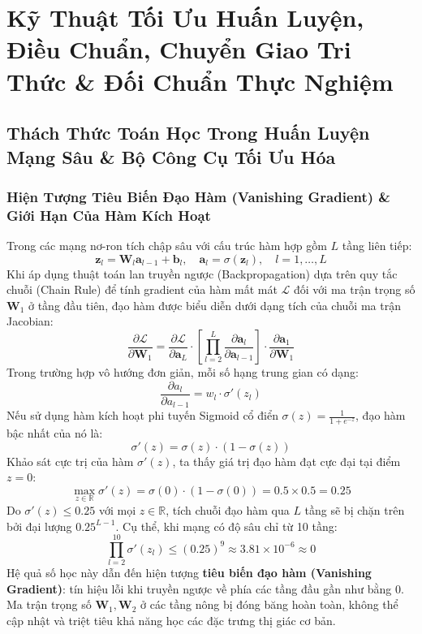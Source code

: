 \documentclass[12pt,a4paper]{report}
\begin{document}
\chapter{Kỹ Thuật Tối Ưu Huấn Luyện, Điều Chuẩn, Chuyển Giao Tri Thức \& Đối Chuẩn Thực Nghiệm}

\section{Thách Thức Toán Học Trong Huấn Luyện Mạng Sâu \& Bộ Công Cụ Tối Ưu Hóa}

\subsection{Hiện Tượng Tiêu Biến Đạo Hàm (Vanishing Gradient) \& Giới Hạn Của Hàm Kích Hoạt}
Trong các mạng nơ-ron tích chập sâu với cấu trúc hàm hợp gồm $L$ tầng liên tiếp:
\begin{equation}
    \mathbf{z}_l = \mathbf{W}_l \mathbf{a}_{l-1} + \mathbf{b}_l, \quad \mathbf{a}_l = \sigma(\mathbf{z}_l), \quad l = 1, \dots, L
\end{equation}
Khi áp dụng thuật toán lan truyền ngược (Backpropagation) dựa trên quy tắc chuỗi (Chain Rule) để tính gradient của hàm mất mát $\mathcal{L}$ đối với ma trận trọng số $\mathbf{W}_1$ ở tầng đầu tiên, đạo hàm được biểu diễn dưới dạng tích của chuỗi ma trận Jacobian:
\begin{equation}
    \frac{\partial \mathcal{L}}{\partial \mathbf{W}_1} = \frac{\partial \mathcal{L}}{\partial \mathbf{a}_L} \cdot \left[ \prod_{l=2}^{L} \frac{\partial \mathbf{a}_l}{\partial \mathbf{a}_{l-1}} \right] \cdot \frac{\partial \mathbf{a}_1}{\partial \mathbf{W}_1}
\end{equation}
Trong trường hợp vô hướng đơn giản, mỗi số hạng trung gian có dạng:
\begin{equation}
    \frac{\partial a_l}{\partial a_{l-1}} = w_l \cdot \sigma'(z_l)
\end{equation}
Nếu sử dụng hàm kích hoạt phi tuyến Sigmoid cổ điển $\sigma(z) = \frac{1}{1 + e^{-z}}$, đạo hàm bậc nhất của nó là:
\begin{equation}
    \sigma'(z) = \sigma(z) \cdot (1 - \sigma(z))
\end{equation}
Khảo sát cực trị của hàm $\sigma'(z)$, ta thấy giá trị đạo hàm đạt cực đại tại điểm $z = 0$:
\begin{equation}
    \max_{z \in \mathbb{R}} \sigma'(z) = \sigma(0) \cdot (1 - \sigma(0)) = 0.5 \times 0.5 = 0.25
\end{equation}
Do $\sigma'(z) \le 0.25$ với mọi $z \in \mathbb{R}$, tích chuỗi đạo hàm qua $L$ tầng sẽ bị chặn trên bởi đại lượng $0.25^{L-1}$. Cụ thể, khi mạng có độ sâu chỉ từ 10 tầng:
\begin{equation}
    \prod_{l=2}^{10} \sigma'(z_l) \le (0.25)^9 \approx 3.81 \times 10^{-6} \approx 0
\end{equation}
Hệ quả số học này dẫn đến hiện tượng \textbf{tiêu biến đạo hàm (Vanishing Gradient)}: tín hiệu lỗi khi truyền ngược về phía các tầng đầu gần như bằng $0$. Ma trận trọng số $\mathbf{W}_1, \mathbf{W}_2$ ở các tầng nông bị đóng băng hoàn toàn, không thể cập nhật và triệt tiêu khả năng học các đặc trưng thị giác cơ bản.
\end{document}
